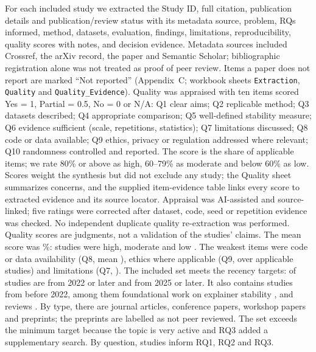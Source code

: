 For each included study we extracted the Study ID, full citation, publication details and publication/review status with its metadata source, problem, RQs informed, method, datasets, evaluation, findings, limitations, reproducibility, quality scores with notes, and decision evidence. Metadata sources included Crossref, the arXiv record, the paper and Semantic Scholar; bibliographic registration alone was not treated as proof of peer review. Items a paper does not report are marked ``Not reported'' (Appendix~C; workbook sheets \texttt{Extraction}, \texttt{Quality} and \texttt{Quality\_Evidence}). Quality was appraised with ten items scored Yes = 1, Partial = 0.5, No = 0 or N/A: Q1 clear aims; Q2 replicable method; Q3 datasets described; Q4 appropriate comparison; Q5 well-defined stability measure; Q6 evidence sufficient (scale, repetitions, statistics); Q7 limitations discussed; Q8 code or data available; Q9 ethics, privacy or regulation addressed where relevant; Q10 randomness controlled and reported. The score is the share of applicable items; we rate 80\% or above as high, 60--79\% as moderate and below 60\% as low. Scores weight the synthesis but did not exclude any study; the Quality sheet summarizes concerns, and the supplied item-evidence table links every score to extracted evidence and its source locator. Appraisal was AI-assisted and source-linked; five ratings were corrected after dataset, code, seed or repetition evidence was checked. No independent duplicate quality re-extraction was performed. Quality scores are judgments, not a validation of the studies' claims. The mean score was \qaMean\%: \qaHigh{} studies were high, \qaMod{} moderate and \qaLow{} low \cite{S15,S55}. The weakest items were code or data availability (Q8, mean \qaQEight), ethics where applicable (Q9, \qaQNine{} over \qaQNineN{} applicable studies) and limitations (Q7, \qaQSeven). The included set meets the recency targets: \incSinceTwentyTwo{} of \totalIncluded{} studies are from 2022 or later and \incSinceTwentyFive{} from 2025 or later. It also contains \incBeforeTwentyTwo{} studies from before 2022, among them foundational work on explainer stability \cite{S01,S04,S08}, and \mapreview{} reviews \evreview. By type, there are \incJournal{} journal articles, \incConference{} conference papers, \incWorkshop{} workshop papers and \incPreprint{} preprints; the preprints are labelled as not peer reviewed. The set exceeds the minimum target because the topic is very active and RQ3 added a supplementary search. By question, \rqOne{} studies inform RQ1, \rqTwo{} RQ2 and \rqThree{} RQ3.

